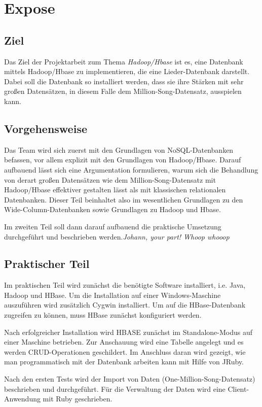 \chapter{Expose}
\section{Ziel}
Das Ziel der Projektarbeit zum Thema \textit{Hadoop/Hbase} ist es, 
eine Datenbank mittels Hadoop/Hbase zu implementieren, die eine Lieder-Datenbank
darstellt. Dabei soll die Datenbank so installiert werden, dass sie ihre Stärken mit
sehr großen Datensätzen, in diesem Falle dem Million-Song-Datensatz, ausspielen kann.

\section{Vorgehensweise}
Das Team wird sich zuerst mit den Grundlagen von NoSQL-Datenbanken befassen, 
vor allem explizit mit den Grundlagen von Hadoop/Hbase. Darauf aufbauend lässt
sich eine Argumentation formulieren, warum sich die Behandlung von derart großen Datensätzen
wie dem Million-Song-Datensatz mit Hadoop/Hbase effektiver gestalten lässt als mit klassischen relationalen Datenbanken. Dieser Teil beinhaltet also im wesentlichen
Grundlagen zu den Wide-Column-Datenbanken sowie Grundlagen zu Hadoop und Hbase.

Im zweiten Teil soll dann darauf aufbauend die praktische Umsetzung durchgeführt und beschrieben
werden.\textit{Johann, your part! Whoop whooop}

\section{Praktischer Teil}
Im praktischen Teil wird zunächst die benötigte Software installiert, i.e. Java, Hadoop und HBase. Um die Installation auf einer Windows-Maschine auszuführen wird zusätzlich Cygwin installiert. Um auf die HBase-Datenbank zugreifen zu können, muss HBase zunächst konfiguriert werden.

Nach erfolgreicher Installation wird HBASE zunächst im Standalone-Modus auf einer Maschine betrieben. Zur Anschauung wird eine Tabelle angelegt und es werden CRUD-Operationen geschildert. Im Anschluss daran wird gezeigt, wie man programmatisch mit der Datenbank arbeiten kann mit Hilfe von JRuby.

Nach den ersten Tests wird der Import von Daten (One-Million-Song-Datensatz) beschrieben und durchgeführt. Für die Verwaltung der Daten wird eine Client-Anwendung mit Ruby geschrieben.

